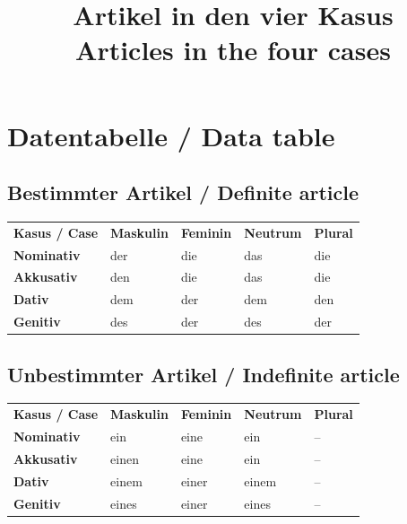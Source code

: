 \documentclass[a4paper,10pt]{article}
\title{\vspace{-1.4cm}\textcolor{HeaderBlueDark}{Artikel in den vier Kasus}\\[-1mm]
{\large\color{SoftGray}Articles in the four cases}}
\date{}
\newcommand{\TableHeader}[1]{\color{white}\textbf{#1}}
\begin{document}
\maketitle
\vspace{-1.25cm}

\section{Datentabelle / Data table}

\subsection{Bestimmter Artikel / Definite article}
\begin{tabularx}{\textwidth}{>{\bfseries}p{3.1cm} YYYY}
\TableHeader{Kasus / Case} & \TableHeader{Maskulin} & \TableHeader{Feminin} & \TableHeader{Neutrum} & \TableHeader{Plural} \\
Nominativ & der & die & das & die \\
Akkusativ & den & die & das & die \\
Dativ & dem & der & dem & den \\
Genitiv & des & der & des & der \\
\end{tabularx}

\subsection{Unbestimmter Artikel / Indefinite article}
\begin{tabularx}{\textwidth}{>{\bfseries}p{3.1cm} YYYY}
\TableHeader{Kasus / Case} & \TableHeader{Maskulin} & \TableHeader{Feminin} & \TableHeader{Neutrum} & \TableHeader{Plural} \\
Nominativ & ein & eine & ein & -- \\
Akkusativ & einen & eine & ein & -- \\
Dativ & einem & einer & einem & -- \\
Genitiv & eines & einer & eines & -- \\
\end{tabularx}
\end{document}
